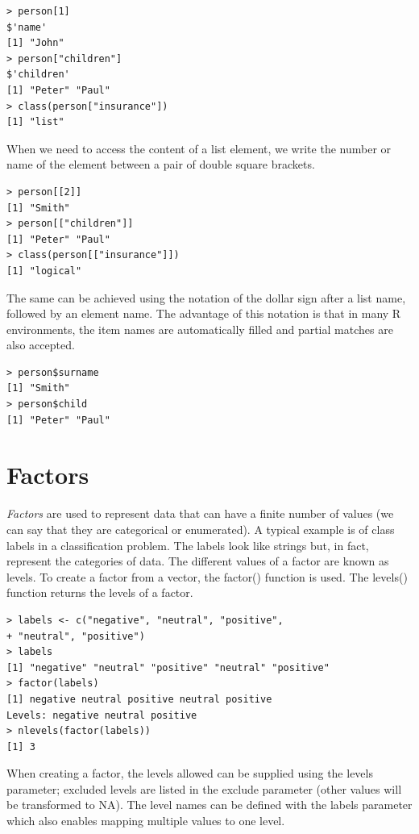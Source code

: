 \documentclass[11pt,openany,executivepaper]{book}
\begin{document}
\begin{verbatim}
> person[1]
$'name'
[1] "John"
> person["children"]
$'children'
[1] "Peter" "Paul"
> class(person["insurance"])
[1] "list"
\end{verbatim}

When we need to access the content of a list element, we write the number or name of the element between a pair of double square brackets.

\begin{verbatim}
> person[[2]]
[1] "Smith"
> person[["children"]]
[1] "Peter" "Paul"
> class(person[["insurance"]])
[1] "logical"
\end{verbatim}

The same can be achieved using the notation of the dollar sign after a list name, followed by an element name. The advantage of this notation is that in many R environments, the item names are automatically filled and partial matches are also accepted.

\begin{verbatim}
> person$surname
[1] "Smith"
> person$child
[1] "Peter" "Paul"
\end{verbatim}

\section{Factors}
\textit{Factors} are used to represent data that can have a finite number of values (we can say that they are categorical or enumerated). A typical example is of class labels in a classification problem. The labels look like strings but, in fact, represent the categories of data. The different values of a factor are known as levels. To create a factor from a vector, the factor() function is used. The levels() function returns the levels of a factor.

\begin{verbatim}
> labels <- c("negative", "neutral", "positive",
+ "neutral", "positive")
> labels
[1] "negative" "neutral" "positive" "neutral" "positive"
> factor(labels)
[1] negative neutral positive neutral positive
Levels: negative neutral positive
> nlevels(factor(labels))
[1] 3
\end{verbatim}

When creating a factor, the levels allowed can be supplied using the levels parameter; excluded levels are listed in the exclude parameter (other values will be transformed to NA). The level names can be defined with the labels parameter which also enables mapping multiple values to one level.
\end{document}

